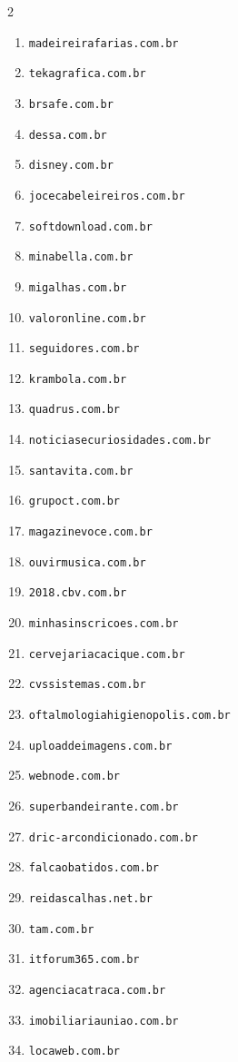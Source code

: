 \begin{multicols}{2}
\begin{enumerate}
    \item \texttt{madeireirafarias.com.br}
    \item \texttt{tekagrafica.com.br}
    \item \texttt{brsafe.com.br}
    \item \texttt{dessa.com.br}
    \item \texttt{disney.com.br}
    \item \texttt{jocecabeleireiros.com.br}
    \item \texttt{softdownload.com.br}
    \item \texttt{minabella.com.br}
    \item \texttt{migalhas.com.br}
    \item \texttt{valoronline.com.br}
    \item \texttt{seguidores.com.br}
    \item \texttt{krambola.com.br}
    \item \texttt{quadrus.com.br}
    \item \texttt{noticiasecuriosidades.com.br}
    \item \texttt{santavita.com.br}
    \item \texttt{grupoct.com.br}
    \item \texttt{magazinevoce.com.br}
    \item \texttt{ouvirmusica.com.br}
    \item \texttt{2018.cbv.com.br}
    \item \texttt{minhasinscricoes.com.br}
    \item \texttt{cervejariacacique.com.br}
    \item \texttt{cvssistemas.com.br}
    \item \texttt{oftalmologiahigienopolis.com.br}
    \item \texttt{uploaddeimagens.com.br}
    \item \texttt{webnode.com.br}
    \item \texttt{superbandeirante.com.br}
    \item \texttt{dric-arcondicionado.com.br}
    \item \texttt{falcaobatidos.com.br}
    \item \texttt{reidascalhas.net.br}
    \item \texttt{tam.com.br}
    \item \texttt{itforum365.com.br}
    \item \texttt{agenciacatraca.com.br}
    \item \texttt{imobiliariauniao.com.br}
    \item \texttt{locaweb.com.br}

\end{enumerate}
\end{multicols}
